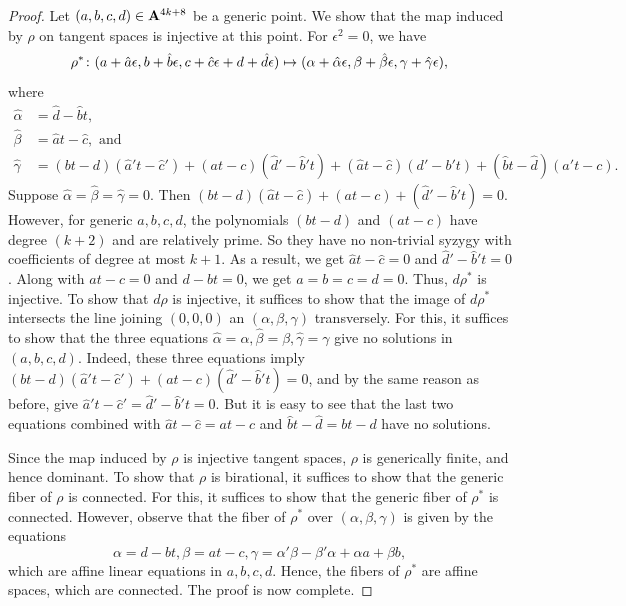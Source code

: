 \documentclass[11pt,reqno]{amsart}
\theoremstyle{plain}
\theoremstyle{definition}
\theoremstyle{remark}
\numberwithin{equation}{section}
\numberwithin{equation}{section}
\begin{document}
\begin{proof}
  Let $(a,b,c,d) \in {\bf A}^{4k+8}$ be a generic point.
  We show that the map induced by $\rho$ on tangent spaces is injective at this point.
  For $\epsilon^2 = 0$, we have
  \[
    \rho^* {\colon} (a + \hat a \epsilon, b+ {\hat b} \epsilon, c +  {\hat c} \epsilon + d +  {\hat d}\epsilon) \mapsto (\alpha + \hat{\alpha} \epsilon,\beta + \hat{\beta} \epsilon, \gamma + \hat{\gamma}\epsilon),
  \]
  where
  \begin{align*}
    \hat \alpha &= \hat d - \hat b t,\\
    \hat \beta &=  \hat a t - \hat c, \text{ and }\\
    \hat \gamma & = (bt-d)({\hat a}'t-{\hat c}') + (at-c)({\hat d}'-{\hat b}'t) + ({\hat a}t-{\hat c})(d'-b't) + ({\hat b}t-{\hat d})(a't-c).
  \end{align*}
  Suppose $\hat \alpha = \hat \beta = \hat \gamma = 0$.
  Then $(bt-d)(\hat a t - \hat c) + (at-c) + (\hat d' - \hat b' t) = 0$.
  However, for generic $a, b, c, d$, the polynomials $(bt-d)$ and $(at-c)$ have degree $(k+2)$ and are relatively prime.
  So they have no non-trivial syzygy with coefficients of degree at most $k+1$.
  As a result, we get $\hat a t - \hat c = 0$ and $\hat d' - \hat b' t = 0$.
  Along with $at -c = 0$ and $d - bt = 0$, we get $a = b = c = d = 0$.
  Thus, $d \rho^*$ is injective.
  To show that $d \rho$ is injective, it suffices to show that the image of $d \rho^*$ intersects the line joining $(0,0,0)$ an $(\alpha, \beta, \gamma)$ transversely.
  For this, it suffices to show that the three equations $\hat \alpha = \alpha, \hat \beta = \beta, \hat \gamma = \gamma$ give no solutions in $(a,b,c,d)$.
  Indeed, these three equations imply $(bt-d)(\hat a' t - \hat c') + (at-c)(\hat d' - \hat b' t) = 0$, and by the same reason as before, give $\hat a' t - \hat c' = \hat d' - \hat b' t = 0$.
  But it is easy to see that the last two equations combined with $\hat a t - \hat c = at -c$ and $\hat b t - \hat d = bt - d$ have no solutions.    

  Since the map induced by $\rho$ is injective tangent spaces, $\rho$ is generically finite, and hence dominant.
  To show that $\rho$ is birational, it suffices to show that the generic fiber of $\rho$ is connected.
  For this, it suffices to show that the generic fiber of $\rho^*$ is connected.
  However, observe that the fiber of $\rho^*$ over $(\alpha, \beta, \gamma)$ is given by the equations
  \[ \alpha = d - bt, \beta = at - c, \gamma = \alpha' \beta - \beta' \alpha + \alpha a + \beta b,\]
  which are affine linear equations in $a,b,c,d$.
  Hence, the fibers of $\rho^*$ are affine spaces, which are connected.
  The proof is now complete.  
\end{proof}
\end{document}
